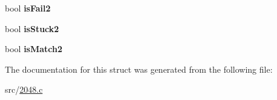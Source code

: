 \begin{DoxyCompactItemize}
\item 
\hypertarget{structplayer_af504be328bd6b81bbcb5fae9732bae25}{bool {\bfseries is\+Fail2}}\label{structplayer_af504be328bd6b81bbcb5fae9732bae25}

\item 
\hypertarget{structplayer_a9607d6ae9eb876db7846538e653978a3}{bool {\bfseries is\+Stuck2}}\label{structplayer_a9607d6ae9eb876db7846538e653978a3}

\item 
\hypertarget{structplayer_a959c0ec06bc29dbc7e29c8cd84413768}{bool {\bfseries is\+Match2}}\label{structplayer_a959c0ec06bc29dbc7e29c8cd84413768}

\end{DoxyCompactItemize}


The documentation for this struct was generated from the following file\+:\begin{DoxyCompactItemize}
\item 
src/\hyperlink{2048_8c}{2048.\+c}\end{DoxyCompactItemize}
